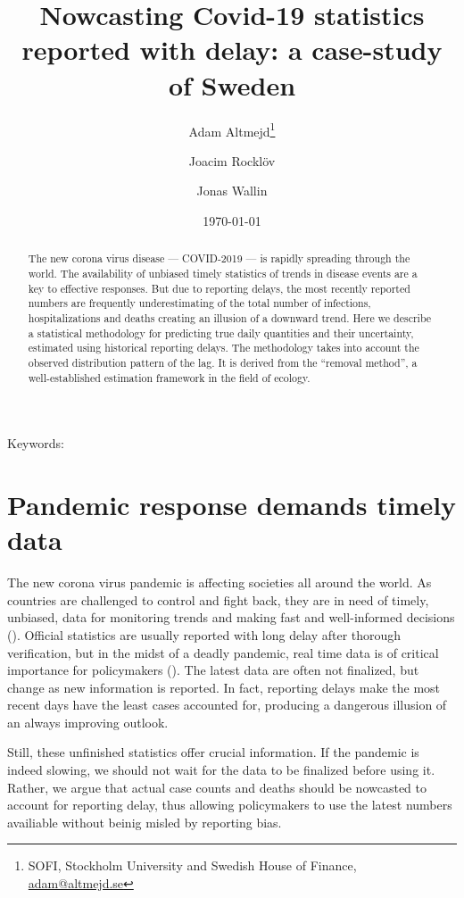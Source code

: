 \documentclass[a4paper,11pt,article,oneside,openany,american]{memoir}
\title{Nowcasting Covid-19 statistics reported with delay: a case-study of Sweden}
\date{\today}
\author{
	Adam Altmejd\thanks{SOFI, Stockholm University and Swedish House of Finance, \href{mailto:adam@altmejd.se}{adam@altmejd.se}} \and
	Joacim Rocklöv \and
	Jonas Wallin
}
\begin{document}
\frontmatter%
\begin{titlingpage}
    \maketitle
    \begin{abstract}
        The new corona virus disease --- COVID-2019 --- is rapidly spreading through the world. The availability of unbiased timely statistics of trends in disease events are a key to effective responses. But due to reporting delays, the most recently reported numbers are frequently underestimating of the total number of infections, hospitalizations and deaths creating an illusion of a downward trend. Here we describe a statistical methodology for predicting true daily quantities and their uncertainty, estimated using historical reporting delays. The methodology takes into account the observed distribution pattern of the lag. It is derived from the ``removal method'', a well-established estimation framework in the field of ecology.
	\end{abstract}

	\noindent Keywords:

\end{titlingpage}
\mainmatter%

\chapter{Pandemic response demands timely data}
The new corona virus pandemic is affecting societies all around the world. As countries are challenged to control and fight back, they are in need of timely, unbiased, data for monitoring trends and making fast and well-informed decisions (\cite{No_author_2020_coronavirus_three}). Official statistics are usually reported with long delay after thorough verification, but in the midst of a deadly pandemic, real time data is of critical importance for policymakers (\cite{Jajosky2004_evaluation_reporting}). The latest data are often not finalized, but change as new information is reported. In fact, reporting delays make the most recent days have the least cases accounted for, producing a dangerous illusion of an always improving outlook.

Still, these unfinished statistics offer crucial information. If the pandemic is indeed slowing, we should not wait for the data to be finalized before using it. Rather, we argue that actual case counts and deaths should be nowcasted to account for reporting delay, thus allowing policymakers to use the latest numbers availiable without beinig misled by reporting bias.
\end{document}

